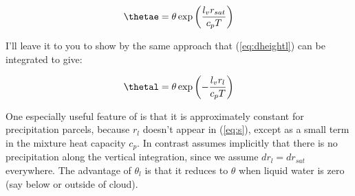 \documentclass[12pt]{article}
\begin{document}
\begin{equation}
  \label{eq:thetae2}
  \thetae = \theta \exp \left ( \frac{l_v r_{sat}}{c_p T} \right )
\end{equation}

I'll leave it to you to show by the same approach that (\ref{eq:dheightl}) can
be integrated to give:

\begin{equation}
  \label{eq:thetal}
  \thetal = \theta \exp \left ( - \frac{l_v r_l}{c_p T} \right )
\end{equation}

One especially useful feature of \thetae is that it is approximately
constant for precipitation parcels, because $r_l$ doesn't appear in
(\ref{eq:s}), except as a small term in the mixture heat capacity $c_p$.
In contrast \thetal assumes implicitly that there is no precipitation
along the vertical integration, since we assume $dr_l = dr_{sat}$ everywhere.
The advantage of $\theta_l$ is that it reduces to $\theta$ when
liquid water is zero (say below or outside of cloud).
\end{document}
